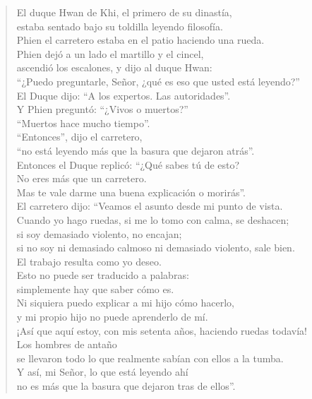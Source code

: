 \documentclass[book,b5paper,hidelinks,final]{memoir}
\begin{document}
	\begin{quote}
		El duque Hwan de Khi, el primero de su dinastía,\\
		estaba sentado bajo su toldilla leyendo filosofía.\\
		Phien el carretero estaba en el patio haciendo una rueda.\\
		Phien dejó a un lado el martillo y el cincel,\\
		ascendió los escalones, y dijo al duque Hwan:\\
		``¿Puedo preguntarle, Señor, ¿qué es eso que usted está leyendo?''\\
		El Duque dijo: ``A los expertos. Las autoridades''.\\
		Y Phien preguntó: ``¿Vivos o muertos?''\\
		``Muertos hace mucho tiempo''.\\
		``Entonces'', dijo el carretero,\\
		``no está leyendo más que la basura que dejaron atrás''.\\
		Entonces el Duque replicó: ``¿Qué sabes tú de esto?\\
		No eres más que un carretero.\\
		Mas te vale darme una buena explicación o morirás''.\\
		El carretero dijo: ``Veamos el asunto desde mi punto de vista.\\
		Cuando yo hago ruedas, si me lo tomo con calma, se deshacen;\\
		si soy demasiado violento, no encajan;\\
		si no soy ni demasiado calmoso ni demasiado violento, sale bien.\\
		El trabajo resulta como yo deseo.\\
		Esto no puede ser traducido a palabras:\\
		simplemente hay que saber cómo es.\\
		Ni siquiera puedo explicar a mi hijo cómo hacerlo,\\
		y mi propio hijo no puede aprenderlo de mí.\\
		¡Así que aquí estoy, con mis setenta años, haciendo ruedas todavía!\\
		Los hombres de antaño\\
		se llevaron todo lo que realmente sabían con ellos a la tumba.\\
		Y así, mi Señor, lo que está leyendo ahí\\
		no es más que la basura que dejaron tras de ellos''.
	\end{quote}
	
\end{document}
